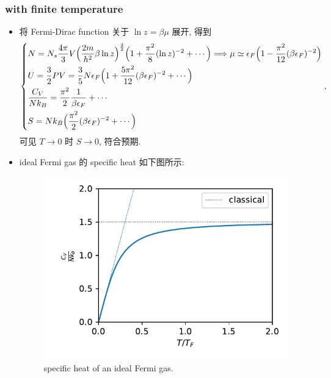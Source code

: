 \subsubsection{with finite temperature}
\begin{itemize}
	\item 将 Fermi-Dirac function 关于 $\ln z = \beta \mu$ 展开, 得到
	\begin{equation} \label{8.1.10}
		\begin{dcases}
			N = N_s \frac{4 \pi}{3} V \Big( \frac{2 m}{h^2} \beta \ln z \Big)^{\frac{3}{2}} \Big( 1 + \frac{\pi^2}{8} (\ln z)^{- 2} + \cdots \Big) \Longrightarrow \mu \simeq \epsilon_F \Big( 1 - \frac{\pi^2}{12} (\beta \epsilon_F)^{- 2} \Big) \\
			U = \frac{3}{2} P V = \frac{3}{5} N \epsilon_F \Big( 1 + \frac{5 \pi^2}{12} (\beta \epsilon_F)^{- 2} + \cdots \Big) \\
			\frac{C_V}{N k_B} = \frac{\pi^2}{2} \frac{1}{\beta \epsilon_F} + \cdots \\
			S = N k_B \Big( \frac{\pi^2}{2} (\beta \epsilon_F)^{- 2} + 
			\cdots \Big)
		\end{dcases},
	\end{equation}
	可见 $T \rightarrow 0$ 时 $S \rightarrow 0$, 符合预期.
	
	\item ideal Fermi gas 的 specific heat 如下图所示:
	
	\begin{figure}[H]
		\centering
		\includegraphics[scale=0.8]{figures/specific heat of an ideal Fermi gas.pdf}
		\caption{specific heat of an ideal Fermi gas.}
		\label{figure 8.2}
	\end{figure}
\end{itemize}

